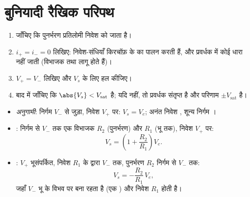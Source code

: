 \section{बुनियादी रैखिक परिपथ}

\begin{method}\label{met:b1:operational-amplifier:method}
\begin{enumerate}
  \item जाँचिए कि पुनर्भरण प्रतिलोमी निवेश को जाता है।
  \item $i_+ = i_- = 0$ लिखिए: निवेश-संधियाँ किरचॉफ़ के  का पालन
        करती हैं, और प्रवर्धक में कोई धारा नहीं जाती (विभाजक तथा  लागू होते हैं)।
  \item $V_+ = V_-$ लिखिए और $V_s$ के लिए हल कीजिए।
  \item बाद में जाँचिए कि $\abs{V_s} < V_{\mathrm{sat}}$ है; यदि नहीं, तो
        प्रवर्धक संतृप्त है और परिणाम $\pm V_{\mathrm{sat}}$ है।
\end{enumerate}
\end{method}

\begin{proposition}[अनुगामी, अ-प्रतिलोमी और प्रतिलोमी प्रवर्धक]\label{prop:b1:operational-amplifier:basic}
\begin{itemize}
  \item \emph{अनुगामी}: निर्गम $V_-$ से जुड़ा, निवेश $V_+$ पर:
        $V_s = V_e$; अनंत निवेश , शून्य निर्गम ।
  \item \emph{}: निर्गम से $V_-$ तक एक
        विभाजक $R_2$ (पुनर्भरण) और $R_1$ (भू तक), निवेश $V_+$ पर:
        \[
        V_s = \left(1 + \frac{R_2}{R_1}\right)V_e .
        \]
  \item \emph{}: $V_+$ भूसंपर्कित, निवेश
        $R_1$ के द्वारा $V_-$ तक, पुनर्भरण $R_2$ निर्गम से $V_-$ तक:
        \[
        V_s = -\frac{R_2}{R_1}\,V_e ,
        \]
        जहाँ $V_-$ भू के विभव पर बना रहता है (एक \emph{})
        और निवेश  $R_1$ होती है।
\end{itemize}
\end{proposition}

